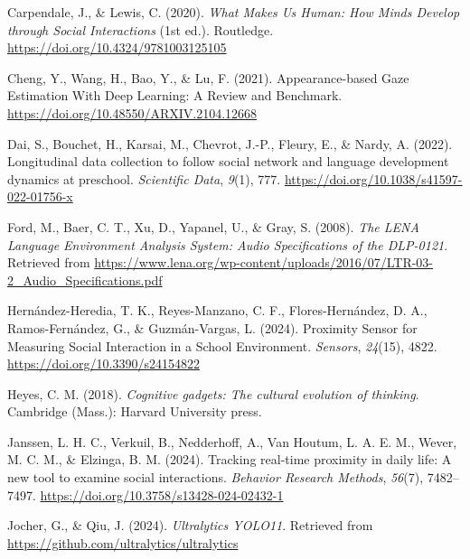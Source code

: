 \documentclass[
  man,floatsintext]{apa6}
\newlength{\cslhangindent}
\newenvironment{CSLReferences}[2] %
 {\begin{list}{}{%
  \setlength{\itemindent}{0pt}
  \setlength{\leftmargin}{0pt}
  \setlength{\parsep}{0pt}
  \ifodd #1
   \setlength{\leftmargin}{\cslhangindent}
   \setlength{\itemindent}{-1\cslhangindent}
  \fi
  \setlength{\itemsep}{#2\baselineskip}}}
 {\end{list}}
\begin{document}
\label{refs}
\begin{CSLReferences}{1}{0}
Carpendale, J., \& Lewis, C. (2020). \emph{What {Makes Us Human}: {How Minds Develop} through {Social Interactions}} (1st ed.). Routledge. \url{https://doi.org/10.4324/9781003125105}

Cheng, Y., Wang, H., Bao, Y., \& Lu, F. (2021). Appearance-based {Gaze Estimation With Deep Learning}: {A Review} and {Benchmark}. \url{https://doi.org/10.48550/ARXIV.2104.12668}

Dai, S., Bouchet, H., Karsai, M., Chevrot, J.-P., Fleury, E., \& Nardy, A. (2022). Longitudinal data collection to follow social network and language development dynamics at preschool. \emph{Scientific Data}, \emph{9}(1), 777. \url{https://doi.org/10.1038/s41597-022-01756-x}

Ford, M., Baer, C. T., Xu, D., Yapanel, U., \& Gray, S. (2008). \emph{The {LENA Language Environment Analysis System}: {Audio Specifications} of the {DLP-0121}}. Retrieved from \url{https://www.lena.org/wp-content/uploads/2016/07/LTR-03-2_Audio_Specifications.pdf}

Hernández-Heredia, T. K., Reyes-Manzano, C. F., Flores-Hernández, D. A., Ramos-Fernández, G., \& Guzmán-Vargas, L. (2024). Proximity {Sensor} for {Measuring Social Interaction} in a {School Environment}. \emph{Sensors}, \emph{24}(15), 4822. \url{https://doi.org/10.3390/s24154822}

Heyes, C. M. (2018). \emph{Cognitive gadgets: The cultural evolution of thinking}. Cambridge (Mass.): Harvard University press.

Janssen, L. H. C., Verkuil, B., Nedderhoff, A., Van Houtum, L. A. E. M., Wever, M. C. M., \& Elzinga, B. M. (2024). Tracking real-time proximity in daily life: {A} new tool to examine social interactions. \emph{Behavior Research Methods}, \emph{56}(7), 7482--7497. \url{https://doi.org/10.3758/s13428-024-02432-1}

Jocher, G., \& Qiu, J. (2024). \emph{Ultralytics {YOLO11}}. Retrieved from \url{https://github.com/ultralytics/ultralytics}


\end{CSLReferences}
\end{document}
